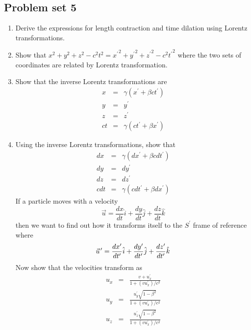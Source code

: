 \subsection{Problem set 5}
\begin{enumerate}
\item Derive the expressions for length contraction and time dilation using
Lorentz transformations.
\item Show that $x^2 + y^2 + z^2 - c^2t^2 = {x^\prime}^2 + {y^\prime}^2 +
{z^\prime}^2 - c^2{t^\prime}^2$ where the two sets of coordinates are related
by Lorentz transformation.
\item Show that the inverse Lorentz transformations are
\begin{eqnarray}
x &=& \gamma(x^\prime + \beta ct^\prime) \label{c1s4e24} \\
y &=& y^\prime \label{c1s4e25} \\
z &=& z^\prime \label{c1s4e26} \\
ct &=& \gamma(ct^\prime + \beta x^\prime) \label{c1s4e27}
\end{eqnarray}
\item Using the inverse Lorentz transformations, show that
\begin{eqnarray}
dx &=& \gamma(dx^\prime + \beta cdt^\prime) \label{c1s4e28} \\
dy &=& dy^\prime \\
dz &=& dz^\prime \\
cdt &=& \gamma(cdt^\prime + \beta dx^\prime) \label{c1s4e29}
\end{eqnarray}
If a particle moves with a velocity
\[
\vec{u} = \frac{dx}{dt}\hat{i} + \frac{dy}{dt}\hat{j} + \frac{dz}{dt}\hat{k}
\]
then we want to find out how it transforms itself to the $S^\prime$ frame of 
reference where
\[
\pvec{u}^\prime = \frac{dx^\prime}{dt^\prime}\hat{i} + 
\frac{dy^\prime}{dt^\prime}\hat{j} + \frac{dz^\prime}{dt^\prime}\hat{k}
\]
Now show that the velocities transform as
\begin{eqnarray}
u_x &=& \frac{v + u_x^\prime}{1 + (vu_x^\prime)/c^2} \label{c1s4e30} \\
u_y &=& \frac{u_y^\prime \sqrt{1 - \beta^2}}{1 + (vu_x^\prime)/c^2} \label{c1s4e31} \\
u_z &=& \frac{u_z^\prime \sqrt{1 - \beta^2}}{1 + (vu_x^\prime)/c^2} \label{c1s4e32}
\end{eqnarray}
\end{enumerate}



